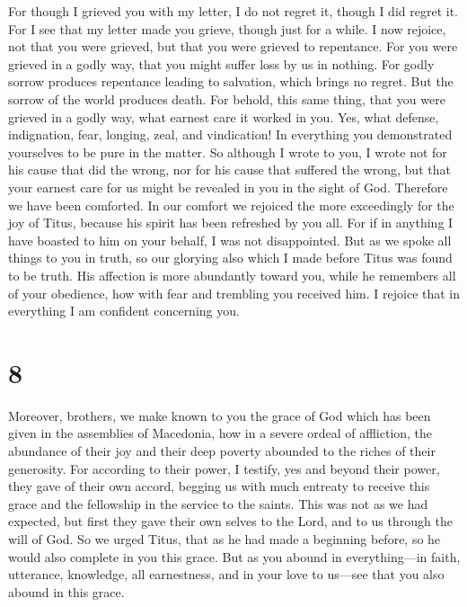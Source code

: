  For though I grieved you with my letter, I do not regret
it, though I did regret it. For I see that my letter made you grieve,
though just for a while.  I now rejoice, not that you were
grieved, but that you were grieved to repentance. For you were grieved
in a godly way, that you might suffer loss by us in nothing.
 For godly sorrow produces repentance leading to salvation,
which brings no regret. But the sorrow of the world produces death.
 For behold, this same thing, that you were grieved in a
godly way, what earnest care it worked in you. Yes, what defense,
indignation, fear, longing, zeal, and vindication! In everything you
demonstrated yourselves to be pure in the matter.  So
although I wrote to you, I wrote not for his cause that did the wrong,
nor for his cause that suffered the wrong, but that your earnest care
for us might be revealed in you in the sight of God. 
Therefore we have been comforted. In our comfort we rejoiced the more
exceedingly for the joy of Titus, because his spirit has been refreshed
by you all.  For if in anything I have boasted to him on
your behalf, I was not disappointed. But as we spoke all things to you
in truth, so our glorying also which I made before Titus was found to be
truth.  His affection is more abundantly toward you, while
he remembers all of your obedience, how with fear and trembling you
received him.  I rejoice that in everything I am confident
concerning you.

\hypertarget{section-7}{%
\section{8}\label{section-7}}

 Moreover, brothers, we make known to you the grace of God
which has been given in the assemblies of Macedonia,  how in
a severe ordeal of affliction, the abundance of their joy and their deep
poverty abounded to the riches of their generosity.  For
according to their power, I testify, yes and beyond their power, they
gave of their own accord,  begging us with much entreaty to
receive this grace and the fellowship in the service to the saints.
 This was not as we had expected, but first they gave their
own selves to the Lord, and to us through the will of God. 
So we urged Titus, that as he had made a beginning before, so he would
also complete in you this grace.  But as you abound in
everything---in faith, utterance, knowledge, all earnestness, and in
your love to us---see that you also abound in this grace.

